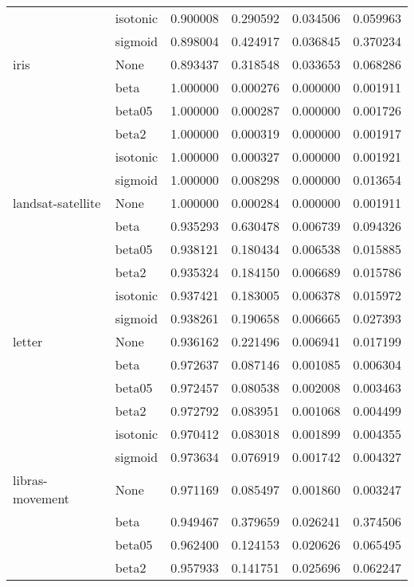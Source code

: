 \begin{tabular}{llrrrr}
        & isotonic &  0.900008 &   0.290592 &  0.034506 &  0.059963 \\
        & sigmoid &  0.898004 &   0.424917 &  0.036845 &  0.370234 \\
iris & None &  0.893437 &   0.318548 &  0.033653 &  0.068286 \\
        & beta &  1.000000 &   0.000276 &  0.000000 &  0.001911 \\
        & beta05 &  1.000000 &   0.000287 &  0.000000 &  0.001726 \\
        & beta2 &  1.000000 &   0.000319 &  0.000000 &  0.001917 \\
        & isotonic &  1.000000 &   0.000327 &  0.000000 &  0.001921 \\
        & sigmoid &  1.000000 &   0.008298 &  0.000000 &  0.013654 \\
landsat-satellite & None &  1.000000 &   0.000284 &  0.000000 &  0.001911 \\
        & beta &  0.935293 &   0.630478 &  0.006739 &  0.094326 \\
        & beta05 &  0.938121 &   0.180434 &  0.006538 &  0.015885 \\
        & beta2 &  0.935324 &   0.184150 &  0.006689 &  0.015786 \\
        & isotonic &  0.937421 &   0.183005 &  0.006378 &  0.015972 \\
        & sigmoid &  0.938261 &   0.190658 &  0.006665 &  0.027393 \\
letter & None &  0.936162 &   0.221496 &  0.006941 &  0.017199 \\
        & beta &  0.972637 &   0.087146 &  0.001085 &  0.006304 \\
        & beta05 &  0.972457 &   0.080538 &  0.002008 &  0.003463 \\
        & beta2 &  0.972792 &   0.083951 &  0.001068 &  0.004499 \\
        & isotonic &  0.970412 &   0.083018 &  0.001899 &  0.004355 \\
        & sigmoid &  0.973634 &   0.076919 &  0.001742 &  0.004327 \\
libras-movement & None &  0.971169 &   0.085497 &  0.001860 &  0.003247 \\
        & beta &  0.949467 &   0.379659 &  0.026241 &  0.374506 \\
        & beta05 &  0.962400 &   0.124153 &  0.020626 &  0.065495 \\
        & beta2 &  0.957933 &   0.141751 &  0.025696 &  0.062247 \\

\end{tabular}
